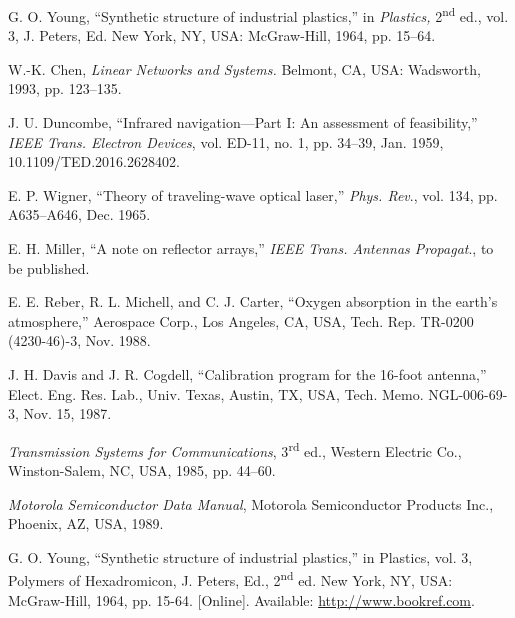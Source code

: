 \documentclass[journal,twoside,web]{ieeecolor}
\begin{document}
\begin{thebibliography}{00}

 G. O. Young, ``Synthetic structure of industrial plastics,'' in \emph{Plastics,} 2\textsuperscript{nd} ed., vol. 3, J. Peters, Ed. New York, NY, USA: McGraw-Hill, 1964, pp. 15--64.

 W.-K. Chen, \emph{Linear Networks and Systems.} Belmont, CA, USA: Wadsworth, 1993, pp. 123--135.

 J. U. Duncombe, ``Infrared navigation---Part I: An assessment of feasibility,'' \emph{IEEE Trans. Electron Devices}, vol. ED-11, no. 1, pp. 34--39, Jan. 1959, 10.1109/TED.2016.2628402.

 E. P. Wigner, ``Theory of traveling-wave optical laser,'' \emph{Phys. Rev}., vol. 134, pp. A635--A646, Dec. 1965.

 E. H. Miller, ``A note on reflector arrays,'' \emph{IEEE Trans. Antennas Propagat}., to be published.

 E. E. Reber, R. L. Michell, and C. J. Carter, ``Oxygen absorption in the earth's atmosphere,'' Aerospace Corp., Los Angeles, CA, USA, Tech. Rep. TR-0200 (4230-46)-3, Nov. 1988.

 J. H. Davis and J. R. Cogdell, ``Calibration program for the 16-foot antenna,'' Elect. Eng. Res. Lab., Univ. Texas, Austin, TX, USA, Tech. Memo. NGL-006-69-3, Nov. 15, 1987.

 \emph{Transmission Systems for Communications}, 3\textsuperscript{rd} ed., Western Electric Co., Winston-Salem, NC, USA, 1985, pp. 44--60.

 \emph{Motorola Semiconductor Data Manual}, Motorola Semiconductor Products Inc., Phoenix, AZ, USA, 1989.

 G. O. Young, ``Synthetic structure of industrial
plastics,'' in Plastics, vol. 3, Polymers of Hexadromicon, J. Peters,
Ed., 2\textsuperscript{nd} ed. New York, NY, USA: McGraw-Hill, 1964, pp. 15-64.
[Online]. Available:
\underline{http://www.bookref.com}.



\end{thebibliography}
\end{document}
